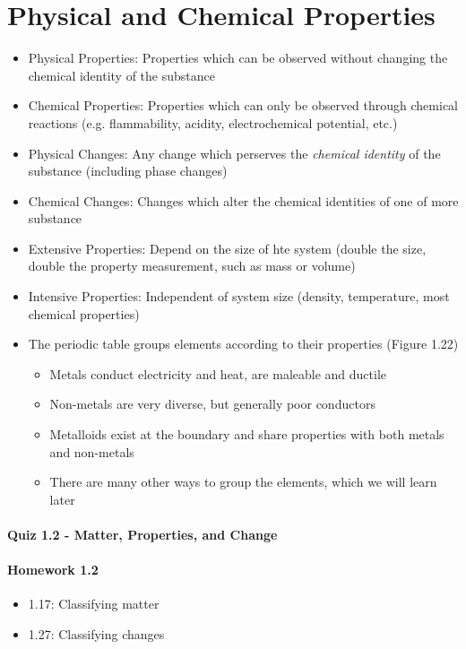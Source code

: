 \documentclass[12pt, openany, letterpaper]{memoir}
\begin{document}
\section{Physical and Chemical Properties}
\begin{itemize}
  \item Physical Properties: Properties which can be observed without changing the chemical identity of the substance
  \item Chemical Properties: Properties which can only be observed through chemical reactions (e.g. flammability, acidity, electrochemical potential, etc.)
  \item Physical Changes: Any change which perserves the \emph{chemical identity} of the substance (including phase changes)
  \item Chemical Changes: Changes which alter the chemical identities of one of more substance
  \item Extensive Properties: Depend on the size of hte system (double the size, double the property measurement, such as mass or volume)
  \item Intensive Properties: Independent of system size (density, temperature, most chemical properties)
  \item The periodic table groups elements according to their properties (Figure 1.22)
  \begin{itemize}
    \item Metals conduct electricity and heat, are maleable and ductile
    \item Non-metals are very diverse, but generally poor conductors
    \item Metalloids exist at the boundary and share properties with both metals and non-metals
    \item There are many other ways to group the elements, which we will learn later
  \end{itemize}
\end{itemize}
\paragraph*{Quiz 1.2 - Matter, Properties, and Change}
\paragraph*{Homework 1.2}
\begin{itemize}
  \item 1.17: Classifying matter
  \item 1.27: Classifying changes
\end{itemize}
\end{document}
